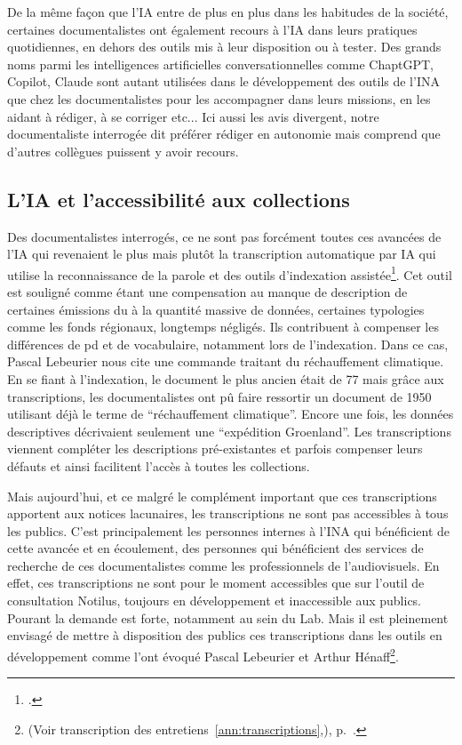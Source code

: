 De la même façon que l'IA entre de plus en plus dans les habitudes de la société, certaines documentalistes ont également recours à l'IA dans leurs pratiques quotidiennes, en dehors des outils mis à leur disposition ou à tester. Des grands noms parmi les intelligences artificielles conversationnelles comme ChaptGPT, Copilot, Claude sont autant utilisées dans le développement des outils de l'INA que chez les documentalistes pour les accompagner dans leurs missions, en les aidant à rédiger, à se corriger etc... Ici aussi les avis divergent, notre documentaliste interrogée dit préférer rédiger en autonomie mais comprend que d'autres collègues puissent y avoir recours. 

\subsection{L'IA et l'accessibilité aux collections}


Des documentalistes interrogés, ce ne sont pas forcément toutes ces avancées de l'IA qui revenaient le plus mais plutôt la transcription automatique par IA qui utilise la reconnaissance de la parole et des outils d'indexation assistée\footcite[][150]{caporiondo-prost2026}. Cet outil est souligné comme étant une compensation au manque de description de certaines émissions du à la quantité massive de données, certaines typologies comme les fonds régionaux, longtemps négligés. Ils contribuent à compenser les différences de \gls{pd} et de vocabulaire, notamment lors de l'indexation. Dans ce cas, Pascal Lebeurier nous cite une commande traitant du réchauffement climatique. En se fiant à l'indexation, le document le plus ancien était de 77 mais grâce aux transcriptions, les documentalistes ont pû faire ressortir un document de 1950 utilisant déjà le terme de \enquote{réchauffement climatique}. Encore une fois, les données descriptives décrivaient seulement une \enquote{expédition Groenland}. Les transcriptions viennent compléter les descriptions pré-existantes et parfois compenser leurs défauts et ainsi facilitent l'accès à toutes les collections. 

Mais aujourd'hui, et ce malgré le complément important que ces transcriptions apportent aux notices lacunaires, les transcriptions ne sont pas accessibles à tous les publics. C'est principalement les personnes internes à l'INA qui bénéficient de cette avancée et en écoulement, des personnes qui bénéficient des services de recherche de ces documentalistes comme les professionnels de l'audiovisuels. En effet, ces transcriptions ne sont pour le moment accessibles que sur l'outil de consultation Notilus, toujours en développement et inaccessible aux publics. Pourant la demande est forte, notamment au sein du Lab. Mais il est pleinement envisagé de mettre à disposition des publics ces transcriptions dans les outils en développement comme l'ont évoqué Pascal Lebeurier et Arthur Hénaff\footnote{(Voir transcription des entretiens~\ref{ann:transcriptions},), p.~\pageref{ann:transcriptions}.}. 

